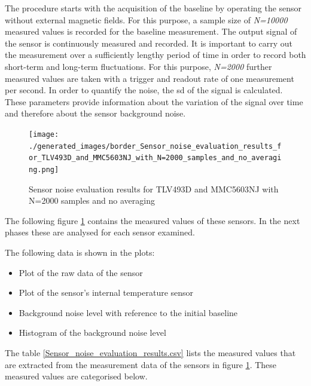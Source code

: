 The procedure starts with the acquisition of the baseline by operating
the sensor without external magnetic fields. For this purpose, a sample
size of \emph{N=10000} measured values is recorded for the baseline
measurement. The output signal of the sensor is continuously measured
and recorded. It is important to carry out the measurement over a
sufficiently lengthy period of time in order to record both short-term
and long-term fluctuations. For this purpose, \emph{N=2000} further
measured values are taken with a trigger and readout rate of one
measurement per second. In order to quantify the noise, the \gls{sd} of
the signal is calculated. These parameters provide information about the
variation of the signal over time and therefore about the sensor
background noise.

\begin{figure}
\centering
\texttt{[image: ./generated\_images/border\_Sensor\_noise\_evaluation\_results\_for\_TLV493D\_and\_MMC5603NJ\_with\_N=2000\_samples\_and\_no\_averaging.png]}
\caption{Sensor noise evaluation results for TLV493D and MMC5603NJ with
N=2000 samples and no averaging
\label{Sensor_noise_evaluation_results_for_TLV493D_and_MMC5603NJ_with_N=2000_samples_and_no_averaging.png}}
\end{figure}

The following figure
\ref{Sensor_noise_evaluation_results_for_TLV493D_and_MMC5603NJ_with_N=2000_samples_and_no_averaging.png}
contains the measured values of these sensors. In the next phases these
are analysed for each sensor examined.

The following data is shown in the plots:

\begin{itemize}
\tightlist
\item
  Plot of the raw data of the sensor
\item
  Plot of the sensor's internal temperature sensor
\item
  Background noise level with reference to the initial baseline
\item
  Histogram of the background noise level
\end{itemize}

The table \ref{Sensor_noise_evaluation_results.csv} lists the measured
values that are extracted from the measurement data of the sensors in
figure
\ref{Sensor_noise_evaluation_results_for_TLV493D_and_MMC5603NJ_with_N=2000_samples_and_no_averaging.png}.
These measured values are categorised below.

